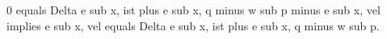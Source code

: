 0 equals Delta e sub x, ist plus e sub x, q minus w sub p minus e sub x, vel implies e sub x, vel equals Delta e sub x, ist plus e sub x, q minus w sub p.